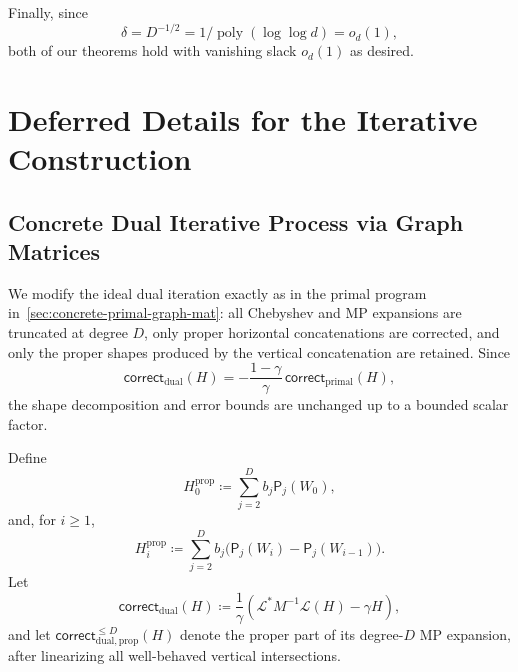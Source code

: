 \documentclass[12pt]{article}
\newcommand{\poly}{\operatorname{poly}}
\newcommand{\corr}{\mathsf{correct}}
\newcommand{\fp}{\mathsf{P}}
\newcommand{\calL}{\mathcal{L}}
\begin{document}
Finally, since
\[
    \delta=D^{-1/2}= 1/\poly(\log \log d)= o_d(1),
\]
both of our theorems hold with vanishing slack $o_d(1)$ as desired.

\clearpage
\newpage


\clearpage
\newpage
\appendix
%

\clearpage
\newpage


\section{Deferred Details for the Iterative Construction} \label{sec:defer-construction}

\subsection{Concrete Dual Iterative Process via Graph Matrices}
\label{app:concrete-dual-iteration}

We modify the ideal dual iteration exactly as in the primal program in~\cref{sec:concrete-primal-graph-mat}: all Chebyshev and MP expansions
are truncated at degree \(D\), only proper horizontal concatenations are
corrected, and only the proper shapes produced by the vertical
concatenation are retained. Since
\[
    \corr_{\mathrm{dual}}(H)
    =
    -\frac{1-\gamma}{\gamma}\,
    \corr_{\mathrm{primal}}(H),
\]
the shape decomposition and error bounds are unchanged up to a bounded
scalar factor.

Define
\[
    H_0^{\mathrm{prop}}
    \coloneqq
    \sum_{j=2}^{D}b_j\fp_j(W_0),
\]
and, for \(i\geq1\),
\[
    H_i^{\mathrm{prop}}
    \coloneqq
    \sum_{j=2}^{D}b_j
    \bigl(\fp_j(W_i)-\fp_j(W_{i-1})\bigr).
\]
Let
\[
    \corr_{\mathrm{dual}}(H)
    \coloneqq
    \frac1\gamma
    \left(
        \calL^\ast M^{-1}\calL(H)-\gamma H
    \right),
\]
and let
\(\corr_{\mathrm{dual,prop}}^{\leq D}(H)\) denote the proper part of
its degree-\(D\) MP expansion, after linearizing all well-behaved
vertical intersections.
\end{document}
